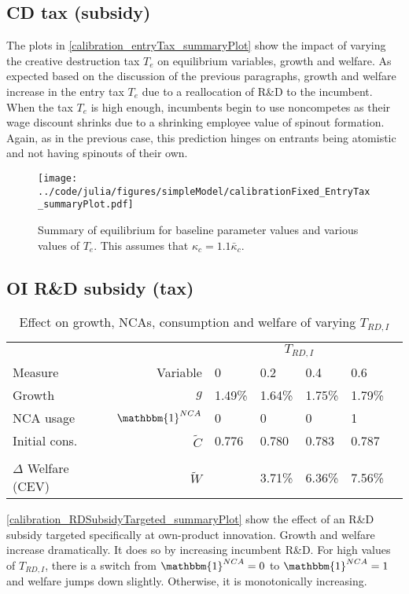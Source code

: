 \documentclass[11pt,english]{article}
\begin{document}
\subsection{CD tax (subsidy)}\label{subsec:cd_tax}

The plots in \autoref{calibration_entryTax_summaryPlot} show the impact of varying the creative destruction tax $T_e$ on equilibrium variables, growth and welfare. As expected based on the discussion of the previous paragraphs, growth and welfare increase in the entry tax $T_e$ due to a reallocation of R\&D to the incumbent. When the tax $T_e$ is high enough, incumbents begin to use noncompetes as their wage discount shrinks due to a shrinking employee value of spinout formation. Again, as in the previous case, this prediction hinges on entrants being atomistic and not having spinouts of their own. 

\begin{figure}[]
	\texttt{[image: ../code/julia/figures/simpleModel/calibrationFixed\_EntryTax\_summaryPlot.pdf]}
	\caption{Summary of equilibrium for baseline parameter values and various values of $T_e$. This assumes that $\kappa_c = 1.1 \bar{\kappa}_c$.}
	\label{calibration_entryTax_summaryPlot}
\end{figure}

\subsection{OI R\&D subsidy (tax)}\label{cs:oi_rd_subsidy}

\begin{table}
	\centering
	\caption{Effect on growth, NCAs, consumption and welfare of varying $T_{RD,I}$}
	\begin{tabular}{lrlllll}
		\toprule \toprule
		&  & \multicolumn{4}{c}{$T_{RD,I}$} \tabularnewline
		Measure &Variable & 0 & 0.2 & 0.4 & 0.6 \tabularnewline
		\midrule
		Growth & $g$ & 1.49\% & 1.64\% & 1.75\% & 1.79\% \tabularnewline
		NCA usage & $\mathbbm{1}^{NCA}$ & 0 & 0 & 0 & 1 \tabularnewline
		Initial cons. & $\tilde{C}$  & 0.776 &  0.780 & 0.783 & 0.787 \tabularnewline 
		\tabularnewline
		$\Delta$ Welfare (CEV) & $\tilde{W}$  &  & 3.71\% & 6.36\% & 7.56\% \tabularnewline
		\bottomrule
	\end{tabular}
\end{table}

\autoref{calibration_RDSubsidyTargeted_summaryPlot} show the effect of an R\&D subsidy targeted specifically at own-product innovation. Growth and welfare increase dramatically. It does so by increasing incumbent R\&D. For high values of $T_{RD,I}$, there is a switch from $\mathbbm{1}^{NCA} = 0$ to $\mathbbm{1}^{NCA} = 1$ and welfare jumps down slightly. Otherwise, it is monotonically increasing. 
\end{document}
